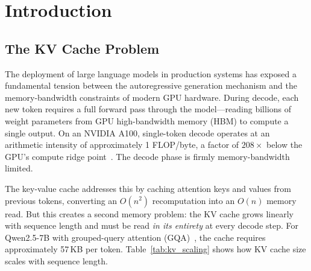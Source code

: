 \documentclass[conference]{IEEEtran}
\begin{document}
\begin{abstract}
We present \textbf{PInsight}, a profiling-guided framework for KV cache optimization that provides per-token, per-layer visibility into cache behavior during inference. PInsight instruments the decode loop to capture three data streams simultaneously: (1) per-step KV cache memory growth and decode latency, (2) per-layer attention weight distributions for token importance scoring, and (3) GPU kernel traces via NVTX-annotated Nsight Systems for bandwidth attribution. Using real attention data from Qwen2.5-7B-Instruct on NVIDIA A100 GPUs, we establish that the first four tokens absorb \textbf{40.8\%} of cumulative attention, only \textbf{0.5\%} of tokens qualify as heavy hitters (compared to H2O's estimate of ${\sim}5\%$), and the bandwidth crossover point occurs at ${\sim}32$K tokens. Our eviction simulation shows that a 50\% cache budget retains 82\% of attention mass, providing empirical guidance for eviction budget selection that existing benchmarks evaluate only post-hoc.
\end{abstract}

\section{Introduction}

\subsection{The KV Cache Problem}

The deployment of large language models in production systems has exposed a fundamental tension between the autoregressive generation mechanism and the memory-bandwidth constraints of modern GPU hardware. During decode, each new token requires a full forward pass through the model---reading billions of weight parameters from GPU high-bandwidth memory (HBM) to compute a single output. On an NVIDIA A100, single-token decode operates at an arithmetic intensity of approximately 1 FLOP/byte, a factor of $208\times$ below the GPU's compute ridge point~\cite{roofline}. The decode phase is firmly memory-bandwidth limited.

The key-value cache addresses this by caching attention keys and values from previous tokens, converting an $O(n^2)$ recomputation into an $O(n)$ memory read. But this creates a second memory problem: the KV cache grows linearly with sequence length and must be read \textit{in its entirety} at every decode step. For Qwen2.5-7B with grouped-query attention (GQA)~\cite{gqa}, the cache requires approximately 57\,KB per token. Table~\ref{tab:kv_scaling} shows how KV cache size scales with sequence length.
\end{document}
